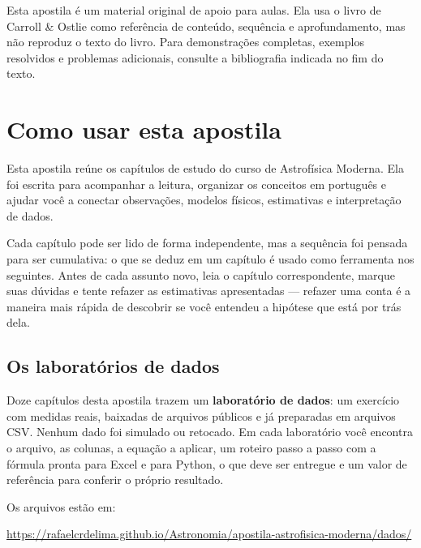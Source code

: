 \documentclass[11pt,a4paper]{article}
\begin{document}

\begin{noticebox}
Esta apostila é um material original de apoio para aulas. Ela usa o livro de Carroll \& Ostlie como referência de conteúdo, sequência e aprofundamento, mas não reproduz o texto do livro. Para demonstrações completas, exemplos resolvidos e problemas adicionais, consulte a bibliografia indicada no fim do texto.
\end{noticebox}

\tableofcontents
\newpage
\listoffigures
\newpage
{}

\section*{Como usar esta apostila}
Esta apostila reúne os capítulos de estudo do curso de Astrofísica Moderna. Ela foi escrita para acompanhar a leitura, organizar os conceitos em português e ajudar você a conectar observações, modelos físicos, estimativas e interpretação de dados.

Cada capítulo pode ser lido de forma independente, mas a sequência foi pensada para ser cumulativa: o que se deduz em um capítulo é usado como ferramenta nos seguintes. Antes de cada assunto novo, leia o capítulo correspondente, marque suas dúvidas e tente refazer as estimativas apresentadas --- refazer uma conta é a maneira mais rápida de descobrir se você entendeu a hipótese que está por trás dela.

\subsection*{Os laboratórios de dados}

Doze capítulos desta apostila trazem um \textbf{laboratório de dados}: um exercício com medidas reais, baixadas de arquivos públicos e já preparadas em arquivos CSV. Nenhum dado foi simulado ou retocado. Em cada laboratório você encontra o arquivo, as colunas, a equação a aplicar, um roteiro passo a passo com a fórmula pronta para Excel e para Python, o que deve ser entregue e um valor de referência para conferir o próprio resultado.

Os arquivos estão em:

\begin{center}
\url{https://rafaelcrdelima.github.io/Astronomia/apostila-astrofisica-moderna/dados/}
\end{center}
\end{document}
